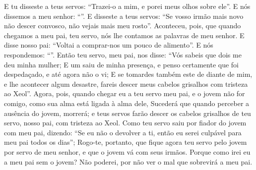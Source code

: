 {{{  E tu disseste a teus servos: \enquote{Trazei-o a mim, e porei meus olhos sobre ele}.
  E nós dissemos a meu senhor: \enquote{}.
  E disseste a teus servos: \enquote{Se vosso irmão mais novo não descer convosco, não vejais mais meu rosto}.
  Aconteceu, pois, que quando chegamos a meu pai, teu servo, nós lhe contamos as palavras de meu senhor. %
  E disse nosso pai: \enquote{Voltai a comprar-nos um pouco de alimento}.
  E nós respondemos: \enquote{}. %
  Então teu servo, meu pai, nos disse: \enquote{Vós sabeis que dois me deu minha mulher;
  E um saiu de minha presença, e penso certamente que foi despedaçado, e até agora não o vi;
  E se tomardes também este de diante de mim, e lhe acontecer algum desastre, fareis descer meus cabelos grisalhos com tristeza ao Xeol}.
  Agora, pois, quando chegar eu a teu servo meu pai, e o jovem não for comigo, como sua alma está ligada à alma dele,
  Sucederá que quando perceber a ausência do jovem, morrerá; e teus servos farão descer os cabelos grisalhos de teu servo, nosso pai, com tristeza ao Xeol.
  Como teu servo saiu por fiador do jovem com meu pai, dizendo: \enquote{Se eu não o devolver a ti, então eu serei culpável para meu pai todos os dias};
  Rogo-te, portanto, que fique agora teu servo pelo jovem por servo de meu senhor, e que o jovem vá com seus irmãos.
  Porque como irei eu a meu pai sem o jovem? Não poderei, por não ver o mal que sobrevirá a meu pai}.
\par }

}
